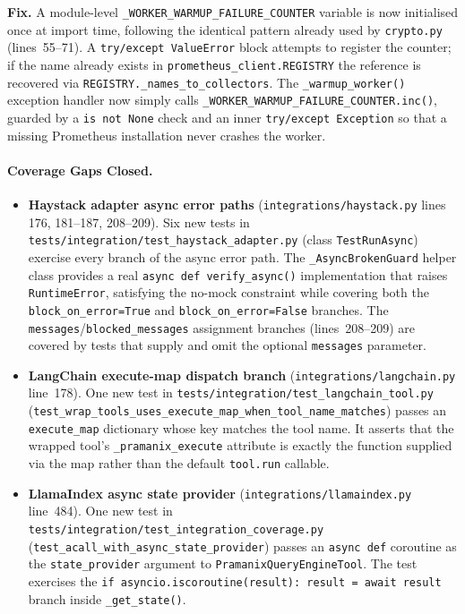 \documentclass[12pt,a4paper,oneside]{report}
\newcommand{\fname}[1]{\texttt{#1}}          %
\newcommand{\code}[1]{\texttt{#1}}           %
\begin{document}
\textbf{Fix.}  A module-level \code{\_WORKER\_WARMUP\_FAILURE\_COUNTER}
variable is now initialised once at import time, following the identical
pattern already used by \code{crypto.py} (lines~55--71).  A
\code{try/except~ValueError} block attempts to register the counter; if the
name already exists in \code{prometheus\_client.REGISTRY} the reference is
recovered via \code{REGISTRY.\_names\_to\_collectors}.  The
\code{\_warmup\_worker()} exception handler now simply calls
\code{\_WORKER\_WARMUP\_FAILURE\_COUNTER.inc()}, guarded by a
\code{is~not~None} check and an inner \code{try/except~Exception} so that a
missing Prometheus installation never crashes the worker.

\paragraph{Coverage Gaps Closed.}

\begin{itemize}

\item \textbf{Haystack adapter async error paths}
  (\fname{integrations/haystack.py} lines 176, 181--187, 208--209).\quad
  Six new tests in \fname{tests/integration/test\_haystack\_adapter.py}
  (class \code{TestRunAsync}) exercise every branch of the async error path.
  The \code{\_AsyncBrokenGuard} helper class provides a real
  \code{async~def~verify\_async()} implementation that raises
  \code{RuntimeError}, satisfying the no-mock constraint while covering
  both the \code{block\_on\_error=True} and \code{block\_on\_error=False}
  branches.  The \code{messages}/\code{blocked\_messages} assignment branches
  (lines~208--209) are covered by tests that supply and omit the optional
  \code{messages} parameter.

\item \textbf{LangChain execute-map dispatch branch}
  (\fname{integrations/langchain.py} line~178).\quad
  One new test in \fname{tests/integration/test\_langchain\_tool.py}
  (\code{test\_wrap\_tools\_uses\_execute\_map\_when\_tool\_name\_matches})
  passes an \code{execute\_map} dictionary whose key matches the tool name.
  It asserts that the wrapped tool's \code{\_pramanix\_execute} attribute is
  exactly the function supplied via the map rather than the default
  \code{tool.run} callable.

\item \textbf{LlamaIndex async state provider}
  (\fname{integrations/llamaindex.py} line~484).\quad
  One new test in \fname{tests/integration/test\_integration\_coverage.py}
  (\code{test\_acall\_with\_async\_state\_provider}) passes an
  \code{async~def} coroutine as the \code{state\_provider} argument to
  \code{PramanixQueryEngineTool}.  The test exercises the
  \code{if asyncio.iscoroutine(result): result = await result} branch
  inside \code{\_get\_state()}.

\end{itemize}
\end{document}
